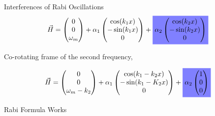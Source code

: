 \documentclass[9pt]{beamer}
\begin{document}
\begin{darkframes}
\begin{frame}{Interferences of Rabi Oscillations}
\begin{equation*}
    \vec H = \begin{pmatrix}
    0\\
    0\\
    \omega_m
    \end{pmatrix} + \alpha_1\begin{pmatrix}
     \cos(k_1x)\\
    -\sin(k_1x)\\
    0
    \end{pmatrix} + \colorbox{blue!50}{$\alpha_2\begin{pmatrix}
    \cos(k_2x)\\
    -\sin(k_2x)\\
    0
    \end{pmatrix}$}
\end{equation*}

Co-rotating frame of the second frequency,



\begin{equation*}
    \vec H = \begin{pmatrix}
    0\\
    0\\
    \omega_m - k_2
    \end{pmatrix} + \alpha_1\begin{pmatrix}
     \cos(k_1-k_2x)\\
    -\sin(k_1-K_2x)\\
    0
\end{pmatrix} + \colorbox{blue!50}{$\alpha_2\begin{pmatrix}
    1\\
    0\\
    0
    \end{pmatrix}$}
\end{equation*}




\end{frame}



\begin{frame}{Rabi Formula Works}



\end{frame}
\end{darkframes}
\end{document}
